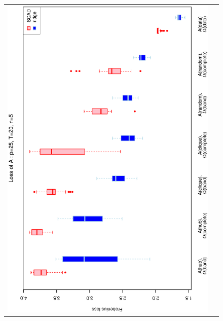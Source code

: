 \begin{figure}[h!]
\centering
\begin{tabular}{cc}
\includegraphics[scale=0.45,angle=270]{LossA25T20N5_25.eps}
\\

\end{tabular}
\end{figure}
